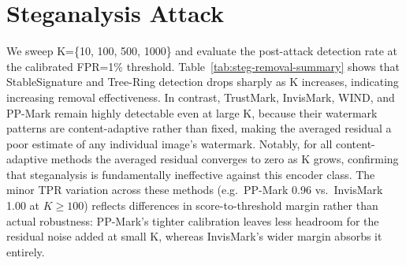\documentclass{article}
\theoremstyle{plain}
\theoremstyle{definition}
\theoremstyle{remark}
\begin{document}
\section{Steganalysis Attack} \label{Steganalysis Attack}
We sweep K=\{10, 100, 500, 1000\} and evaluate the post-attack detection rate at the calibrated FPR=1\% threshold. Table~\ref{tab:steg-removal-summary} shows that StableSignature and Tree-Ring detection drops sharply as K increases, indicating increasing removal effectiveness. In contrast, TrustMark, InvisMark, WIND, and PP-Mark remain highly detectable even at large K, because their watermark patterns are content-adaptive rather than fixed, making the averaged residual a poor estimate of any individual image's watermark.
Notably, for all content-adaptive methods the averaged residual converges to zero as K grows, confirming that steganalysis is fundamentally ineffective against this encoder class. The minor TPR variation across these methods (e.g.\ PP-Mark 0.96 vs.\ InvisMark 1.00 at $K{\ge}100$) reflects differences in score-to-threshold margin rather than actual robustness: PP-Mark's tighter calibration leaves less headroom for the residual noise added at small K, whereas InvisMark's wider margin absorbs it entirely.
\end{document}
